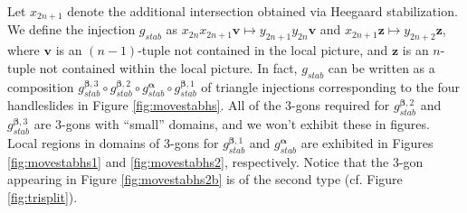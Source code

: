 \documentclass[11pt]{article}
\theoremstyle{plain} \newtheorem{thm}{Theorem}[subsection]
\theoremstyle{plain} \newtheorem{cor}[thm]{Corollary}
\theoremstyle{plain} \newtheorem{prop}[thm]{Proposition}
\theoremstyle{plain} \newtheorem{conj}[thm]{Conjecture}
\theoremstyle{plain} \newtheorem{lem}[thm]{Lemma}
\theoremstyle{definition} \newtheorem{df}[thm]{Definition}
\theoremstyle{remark} \newtheorem{rmk}[thm]{Remark}
\theoremstyle{remark} \newtheorem{obs}[thm]{Observation}
\newcommand{\ba}{\boldsymbol{\alpha}}
\newcommand{\bb}{\boldsymbol{\beta}}
\newcommand{\bv}{\mathbf{v}}
\newcommand{\bz}{\mathbf{z}}
\begin{document}

Let $x_{2n+1}$ denote the additional intersection obtained via Heegaard stabilization.  We define the injection $g_{stab}$ as $x_{2n}x_{2n+1} \bv \mapsto y_{2n+1} y_{2n} \bv$ and $x_{2n+1}\bz \mapsto y_{2n+2} \bz$, 
where $\bv $ is an $(n-1)$-tuple not contained in the local picture, and $\bz $ is an $n$-tuple not contained within the local picture. In fact, $g_{stab}$ can be written as a composition $g_{stab}^{\bb,3}\circ g_{stab}^{\bb,2}\circ g_{stab}^{\ba} \circ g_{stab}^{\bb,1}$ of triangle injections corresponding to the four handleslides in Figure \ref{fig:movestabhs}.   All of the 3-gons required for $g_{stab}^{\bb,2}$ and $g_{stab}^{\bb,3}$ are 3-gons with ``small'' domains, and we won't exhibit these in figures.  Local regions in domains of 3-gons for $g_{stab}^{\bb,1}$ and $g_{stab}^{\ba}$ are exhibited in Figures \ref{fig:movestabhs1} and \ref{fig:movestabhs2}, respectively.  Notice that the 3-gon appearing in Figure \ref{fig:movestabhs2b} is of the second type (cf. Figure \ref{fig:trisplit}).
\end{document}
